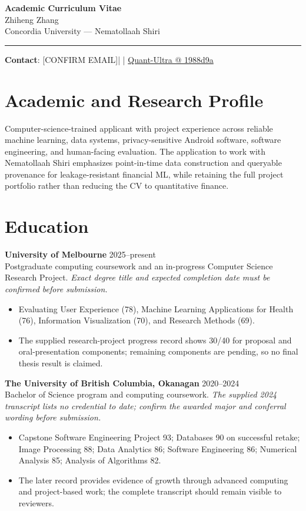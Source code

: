 \documentclass[11pt]{article}
\makeatletter
\newcommand{\ApplicantName}{Zhiheng Zhang}
\newcommand{\ApplicantEmail}{[CONFIRM EMAIL]}
\newcommand{\ApplicantPhone}{[CONFIRM PHONE]}
\newcommand{\ApplicantGitHub}{\href{https://github.com/zhiheng-zhang-Mera/Quant-Ultra/tree/1988d9a8530da91a8158de864d098ea869098923}{Quant-Ultra @ 1988d9a}}
\makeatother
\begin{document}
\begin{center}
{\LARGE\bfseries Academic Curriculum Vitae}\\[0.25em]
{\large \ApplicantName}\\
Concordia University --- Nematollaah Shiri
\end{center}
\vspace{0.35em}\hrule\vspace{0.65em}

\textbf{Contact}: \ApplicantEmail\quad | \quad \ApplicantPhone\quad | \quad \ApplicantGitHub

\section*{Academic and Research Profile}
Computer-science-trained applicant with project experience across reliable machine learning, data systems, privacy-sensitive Android software, software engineering, and human-facing evaluation. The application to work with Nematollaah Shiri emphasizes point-in-time data construction and queryable provenance for leakage-resistant financial ML, while retaining the full project portfolio rather than reducing the CV to quantitative finance.

\section*{Education}
\textbf{University of Melbourne} \hfill 2025--present\\
Postgraduate computing coursework and an in-progress Computer Science Research Project. \textit{Exact degree title and expected completion date must be confirmed before submission.}
\begin{itemize}
\item Evaluating User Experience (78), Machine Learning Applications for Health (76), Information Visualization (70), and Research Methods (69).
\item The supplied research-project progress record shows 30/40 for proposal and oral-presentation components; remaining components are pending, so no final thesis result is claimed.
\end{itemize}

\textbf{The University of British Columbia, Okanagan} \hfill 2020--2024\\
Bachelor of Science program and computing coursework. \textit{The supplied 2024 transcript lists no credential to date; confirm the awarded major and conferral wording before submission.}
\begin{itemize}
\item Capstone Software Engineering Project 93; Databases 90 on successful retake; Image Processing 88; Data Analytics 86; Software Engineering 86; Numerical Analysis 85; Analysis of Algorithms 82.
\item The later record provides evidence of growth through advanced computing and project-based work; the complete transcript should remain visible to reviewers.
\end{itemize}
\end{document}
